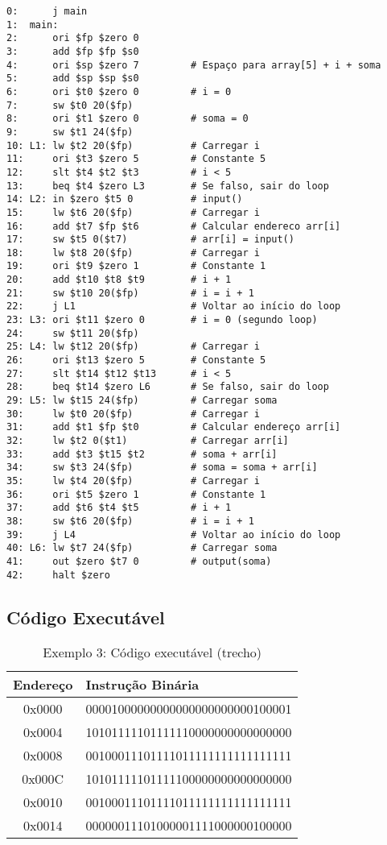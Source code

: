 \documentclass[
	12pt,				%
	oneside,
	a4paper,			%
	english,			%
	french,				%
	spanish,			%
	brazil,				%
	]{abntex2}
\begin{document}
\begin{lstlisting}[style=assemblystyle, caption=Exemplo 3: Código assembly MIPS (trecho)]
0:      j main
1:  main:
2:      ori $fp $zero 0
3:      add $fp $fp $s0
4:      ori $sp $zero 7         # Espaço para array[5] + i + soma
5:      add $sp $sp $s0
6:      ori $t0 $zero 0         # i = 0
7:      sw $t0 20($fp)
8:      ori $t1 $zero 0         # soma = 0
9:      sw $t1 24($fp)
10: L1: lw $t2 20($fp)          # Carregar i
11:     ori $t3 $zero 5         # Constante 5
12:     slt $t4 $t2 $t3         # i < 5
13:     beq $t4 $zero L3        # Se falso, sair do loop
14: L2: in $zero $t5 0          # input()
15:     lw $t6 20($fp)          # Carregar i
16:     add $t7 $fp $t6         # Calcular endereco arr[i]
17:     sw $t5 0($t7)           # arr[i] = input()
18:     lw $t8 20($fp)          # Carregar i
19:     ori $t9 $zero 1         # Constante 1
20:     add $t10 $t8 $t9        # i + 1
21:     sw $t10 20($fp)         # i = i + 1
22:     j L1                    # Voltar ao início do loop
23: L3: ori $t11 $zero 0        # i = 0 (segundo loop)
24:     sw $t11 20($fp)
25: L4: lw $t12 20($fp)         # Carregar i
26:     ori $t13 $zero 5        # Constante 5
27:     slt $t14 $t12 $t13      # i < 5
28:     beq $t14 $zero L6       # Se falso, sair do loop
29: L5: lw $t15 24($fp)         # Carregar soma
30:     lw $t0 20($fp)          # Carregar i
31:     add $t1 $fp $t0         # Calcular endereço arr[i]
32:     lw $t2 0($t1)           # Carregar arr[i]
33:     add $t3 $t15 $t2        # soma + arr[i]
34:     sw $t3 24($fp)          # soma = soma + arr[i]
35:     lw $t4 20($fp)          # Carregar i
36:     ori $t5 $zero 1         # Constante 1
37:     add $t6 $t4 $t5         # i + 1
38:     sw $t6 20($fp)          # i = i + 1
39:     j L4                    # Voltar ao início do loop
40: L6: lw $t7 24($fp)          # Carregar soma
41:     out $zero $t7 0         # output(soma)
42:     halt $zero
\end{lstlisting}

\subsection{Código Executável}

\begin{table}[H]
\centering
\caption{Exemplo 3: Código executável (trecho)}
\begin{tabular}{|c|l|}
\hline
\textbf{Endereço} & \textbf{Instrução Binária} \\
\hline
0x0000 & 00001000000000000000000000100001 \\
\hline
0x0004 & 10101111101111110000000000000000 \\
\hline
0x0008 & 00100011101111011111111111111111 \\
\hline
0x000C & 10101111101111100000000000000000 \\
\hline
0x0010 & 00100011101111011111111111111111 \\
\hline
0x0014 & 00000011101000001111000000100000 \\
\hline
\end{tabular}
\end{table}
\end{document}
